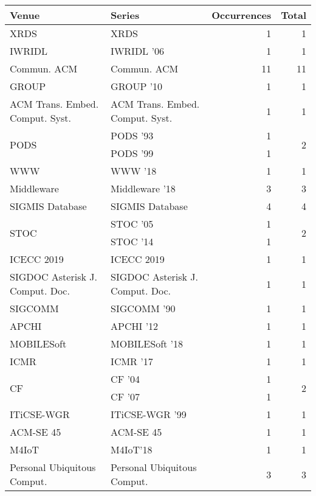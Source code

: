 \begin{table*}[t]
\begin{tabular}{llrr}
Venue & Series & Occurrences & Total\\\hline
\multirow{1}{*}{XRDS} & XRDS & 1 & \multirow{1}{*}{1}\\
\multirow{1}{*}{IWRIDL } & IWRIDL '06 & 1 & \multirow{1}{*}{1}\\
\multirow{1}{*}{Commun. ACM} & Commun. ACM & 11 & \multirow{1}{*}{11}\\
\multirow{1}{*}{GROUP } & GROUP '10 & 1 & \multirow{1}{*}{1}\\
\multirow{1}{*}{ACM Trans. Embed. Comput. Syst.} & ACM Trans. Embed. Comput. Syst. & 1 & \multirow{1}{*}{1}\\
\multirow{2}{*}{PODS } & PODS '93 & 1 & \multirow{2}{*}{2}\\
& PODS '99 & 1 &\\
\multirow{1}{*}{WWW } & WWW '18 & 1 & \multirow{1}{*}{1}\\
\multirow{1}{*}{Middleware } & Middleware '18 & 3 & \multirow{1}{*}{3}\\
\multirow{1}{*}{SIGMIS Database} & SIGMIS Database & 4 & \multirow{1}{*}{4}\\
\multirow{2}{*}{STOC } & STOC '05 & 1 & \multirow{2}{*}{2}\\
& STOC '14 & 1 &\\
\multirow{1}{*}{ICECC 2019} & ICECC 2019 & 1 & \multirow{1}{*}{1}\\
\multirow{1}{*}{SIGDOC Asterisk J. Comput. Doc.} & SIGDOC Asterisk J. Comput. Doc. & 1 & \multirow{1}{*}{1}\\
\multirow{1}{*}{SIGCOMM } & SIGCOMM '90 & 1 & \multirow{1}{*}{1}\\
\multirow{1}{*}{APCHI } & APCHI '12 & 1 & \multirow{1}{*}{1}\\
\multirow{1}{*}{MOBILESoft } & MOBILESoft '18 & 1 & \multirow{1}{*}{1}\\
\multirow{1}{*}{ICMR } & ICMR '17 & 1 & \multirow{1}{*}{1}\\
\multirow{2}{*}{CF } & CF '04 & 1 & \multirow{2}{*}{2}\\
& CF '07 & 1 &\\
\multirow{1}{*}{ITiCSE-WGR } & ITiCSE-WGR '99 & 1 & \multirow{1}{*}{1}\\
\multirow{1}{*}{ACM-SE 45} & ACM-SE 45 & 1 & \multirow{1}{*}{1}\\
\multirow{1}{*}{M4IoT} & M4IoT'18 & 1 & \multirow{1}{*}{1}\\
\multirow{1}{*}{Personal Ubiquitous Comput.} & Personal Ubiquitous Comput. & 3 & \multirow{1}{*}{3}\\

\end{tabular}
\end{table*}
